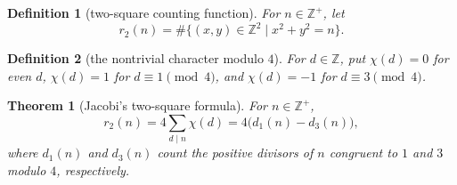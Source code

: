 \documentclass[11pt]{article}
\theoremstyle{ntstyle}
\newtheorem{theorem}{Theorem}[subsection]
\newtheorem{definition}{Definition}[subsection]
\begin{document}
\begin{definition}[two-square counting function]\label{def:8.3.1}\label{def:two-square-counting-function}
  For $n\in\mathbb{Z}^+$, let
  \[
    r_2(n)=\#\{(x,y)\in\mathbb{Z}^2 \mid x^2+y^2=n\}.
  \]

\end{definition}

\begin{definition}[the nontrivial character modulo $4$]\label{def:8.3.2}\label{def:the-nontrivial-character-modulo-4}
  For $d\in\mathbb{Z}$, put $\chi(d)=0$ for even $d$, $\chi(d)=1$ for
  $d\equiv1\pmod{4}$, and $\chi(d)=-1$ for $d\equiv3\pmod{4}$.

\end{definition}

\begin{theorem}[Jacobi's two-square formula]\label{thm:8.3.1}\label{thm:jacobi-two-square-formula}
  For
  $n\in\mathbb{Z}^+$,
  \[
    r_2(n)=4\sum_{d\mid n}\chi(d)=4\big(d_1(n)-d_3(n)\big),
  \]
  where $d_1(n)$ and $d_3(n)$ count the positive divisors of $n$
  congruent to $1$ and $3$ modulo $4$, respectively.

\end{theorem}
\end{document}
